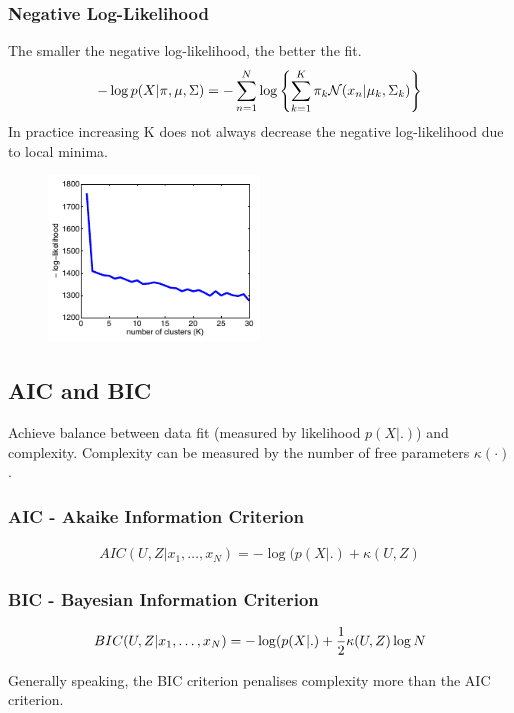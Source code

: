 \subsubsection{Negative Log-Likelihood}
The smaller the negative log-likelihood, the better the fit.
\begin{align*}
    -\log p(X|\pi, \mu, \Sigma) = - \sum_{n=1}^N \log \left\{ \sum_{k=1}^K \pi_k \mathcal N(x_n|\mu_k, \Sigma_k)\right\}
\end{align*}
In practice increasing K does not always decrease the negative log-likelihood due to local minima.\begin{figure}[H]
    \centering
    \includegraphics[width=0.5\textwidth]{img/kmeans_log_likelihood_plot}
\end{figure}

\subsection{AIC and BIC}
Achieve balance between data fit (measured by likelihood $p(X|.)$) and complexity. Complexity can be measured by the number of free parameters $\kappa(\cdot)$.
\subsubsection{AIC - Akaike Information Criterion}
\begin{align*}
    AIC(U,Z|x_1,\ldots, x_N) = -\log(p(X|.)+\kappa(U,Z)
\end{align*}

\subsubsection{BIC - Bayesian Information Criterion}
\begin{align*}
    BIC(U,Z|x_1,\ldots, x_N) = -\log(p(X|.)+{1\over 2}\kappa(U,Z)\log N
\end{align*}

Generally speaking, the BIC criterion penalises complexity more
than the AIC criterion.

